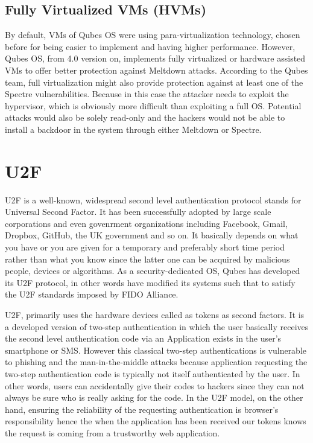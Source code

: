 \documentclass[runningheads,a4paper]{article}
\begin{document}
\subsection{Fully Virtualized VMs (HVMs)}
By default, VMs of Qubes OS were using para-virtualization technology, chosen before for being easier to implement and having higher performance. However, Qubes OS, from 4.0 version on, implements fully virtualized or hardware assisted VMs to offer better protection against Meltdown attacks. According to the Qubes team, full virtualization might also provide protection against at least one of the Spectre vulnerabilities. Because in this case the attacker needs to exploit the hypervisor, which is obviously more difficult than exploiting a full OS. Potential attacks would also be solely read-only and the hackers would not be able to install a backdoor in the system through either Meltdown or Spectre. 

\section{U2F}
U2F is a well-known, widespread second level authentication protocol stands for Universal Second Factor. It has been successfully adopted by large scale corporations and even govenrment organizations including Facebook, Gmail, Dropbox, GitHub, the UK government and so on. It basically depends on what you have or you are given for a temporary and preferably short time period rather than what you know since the latter one can be acquired by malicious people, devices or algorithms. As a security-dedicated OS, Qubes has developed its U2F protocol, in other words have modified its systems such that to satisfy the U2F standards imposed by FIDO Alliance. 

U2F, primarily uses the hardware devices called as tokens as second factors. It is a developed version of two-step authentication in which the user basically receives the second level authentication code via an Application exists in the user's smartphone or SMS. However this classical two-step authentications is vulnerable to phishing and the man-in-the-middle attacks because application requesting the two-step authentication code is typically not itself authenticated by the user. In other words, users can accidentally give their codes to hackers since they can not always be sure who is really asking for the code. In the U2F model, on the other hand, ensuring the reliability of the requesting authentication is browser's responsibility hence the when the application has been received our tokens knows the request is coming from a trustworthy web application. 
\end{document}
